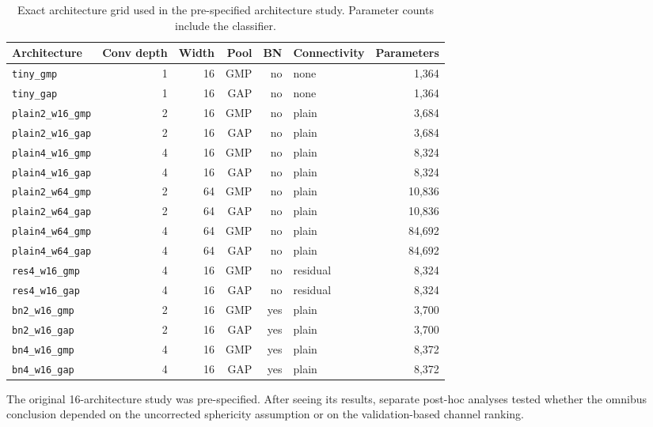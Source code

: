 \begin{table}[h]
\caption{Exact architecture grid used in the pre-specified architecture study. Parameter counts include the classifier.}
\label{tab:architecture-definitions}
\centering
\scriptsize
\setlength{\tabcolsep}{3pt}
\begin{tabular}{lrrrrlr}
\toprule
Architecture & Conv depth & Width & Pool & BN & Connectivity & Parameters \\
\midrule
\texttt{tiny\_gmp} & 1 & 16 & GMP & no & none & 1,364 \\
\texttt{tiny\_gap} & 1 & 16 & GAP & no & none & 1,364 \\
\texttt{plain2\_w16\_gmp} & 2 & 16 & GMP & no & plain & 3,684 \\
\texttt{plain2\_w16\_gap} & 2 & 16 & GAP & no & plain & 3,684 \\
\texttt{plain4\_w16\_gmp} & 4 & 16 & GMP & no & plain & 8,324 \\
\texttt{plain4\_w16\_gap} & 4 & 16 & GAP & no & plain & 8,324 \\
\texttt{plain2\_w64\_gmp} & 2 & 64 & GMP & no & plain & 10,836 \\
\texttt{plain2\_w64\_gap} & 2 & 64 & GAP & no & plain & 10,836 \\
\texttt{plain4\_w64\_gmp} & 4 & 64 & GMP & no & plain & 84,692 \\
\texttt{plain4\_w64\_gap} & 4 & 64 & GAP & no & plain & 84,692 \\
\texttt{res4\_w16\_gmp} & 4 & 16 & GMP & no & residual & 8,324 \\
\texttt{res4\_w16\_gap} & 4 & 16 & GAP & no & residual & 8,324 \\
\texttt{bn2\_w16\_gmp} & 2 & 16 & GMP & yes & plain & 3,700 \\
\texttt{bn2\_w16\_gap} & 2 & 16 & GAP & yes & plain & 3,700 \\
\texttt{bn4\_w16\_gmp} & 4 & 16 & GMP & yes & plain & 8,372 \\
\texttt{bn4\_w16\_gap} & 4 & 16 & GAP & yes & plain & 8,372 \\
\bottomrule
\end{tabular}
\end{table}

The original 16-architecture study was pre-specified. After seeing its results, separate post-hoc analyses tested whether the omnibus conclusion depended on the uncorrected sphericity assumption or on the validation-based channel ranking.

